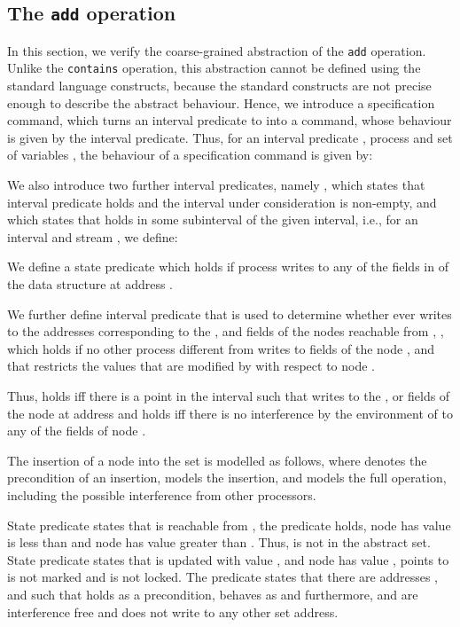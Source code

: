 \documentclass{article}
\theoremstyle{plain}
\theoremstyle{definition}
\begin{document}
\subsection{The \texttt{add} operation}

In this section, we verify the coarse-grained abstraction of the
\texttt{add} operation.  Unlike the \texttt{contains} operation, this
abstraction cannot be defined using the standard language constructs,
because the standard constructs are not precise enough to describe the
abstract behaviour.  Hence, we introduce a specification command,
which turns an interval predicate to into a command, whose behaviour
is given by the interval predicate. Thus, for an interval predicate
, process  and set of variables , the behaviour of a
specification command is given by:


We also introduce two further interval predicates, namely ,
which states that interval predicate  holds and the interval under
consideration is non-empty, and  which states that 
holds in some subinterval of the given interval, i.e., for an interval
 and stream , we define: 

We define a state predicate  which holds if
process  writes to any of the fields in  of the data structure
at address .

We further define interval predicate  that is used to
determine whether  ever writes to the addresses corresponding to
the ,  and  fields of the nodes reachable from ,
, which holds if no other process different from 
writes to fields of the node , and  that restricts the
values that are modified by  with respect to node .

Thus,  holds iff there is a point in the interval such that
 writes to the ,  or  fields of the node at address
 and  holds iff there is no interference by the
environment of  to any of the fields of node .

The insertion of a node into the set is modelled as follows, where
 denotes the precondition of an insertion,  models the
insertion, and  models the full operation, including the
possible interference from other processors. 

State predicate  states that  is reachable from
, the  predicate holds, node  has value is less
than  and node  has value greater than . Thus,  is not in
the abstract set. State predicate  states that  is updated with value , and node  has value ,
points to  is not marked and is not locked. The 
predicate states that there are addresses ,  and  such that
 holds as a precondition, behaves as 
and furthermore,  and  are interference free and  does not
write to any other set address.
\end{document}
